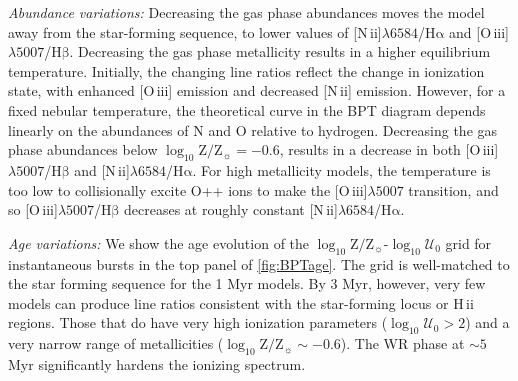 \documentclass[linenumbers, trackchanges, tighten]{aastex61}%
\newcommand{\Fig}[1]{\autoref{fig:#1}}
\newcommand{\logten}{\ensuremath{\log_{10}}}
\newcommand{\nii}{[N\,{\sc ii}]\xspace}
\newcommand{\oiii}{[O\,{\sc iii}]\xspace}
\newcommand{\ha}{\ensuremath{\mathrm{H\alpha}}}
\newcommand{\hb}{\ensuremath{\mathrm{H\beta}}}
\newcommand{\hii}{H\,{\sc ii}\xspace}
\newcommand\lam[1]{\ensuremath{\lambda #1}}
\newcommand{\logz}{\ensuremath{\logten \mathrm{Z}/\mathrm{Z}_{\sun}}}
\newcommand{\logZeq}[1]{\ensuremath{\logten \mathrm{Z}/\mathrm{Z}_{\sun} = #1}}
\newcommand{\logU}{\ensuremath{\logten \mathcal{U}_0}}
\newcommand\niiha{\nii{}\lam{6584}/\ha{}}
\newcommand\oiiihb{\oiii{}\lam{5007}/\hb{}}
\begin{document}
{\it Abundance variations:} Decreasing the gas phase abundances moves the model away from the star-forming sequence, to lower values of \niiha{} and \oiiihb{}. Decreasing the gas phase metallicity results in a higher equilibrium temperature. Initially, the changing line ratios reflect the change in ionization state, with enhanced \oiii{} emission and decreased \nii{} emission. However, for a fixed nebular temperature, the theoretical curve in the BPT diagram depends linearly on the abundances of N and O relative to hydrogen. Decreasing the gas phase abundances below \logZeq{-0.6},  results in a decrease in both \oiiihb{} and \niiha{}. For high metallicity models, the temperature is too low to collisionally excite O++ ions to make the \oiii{}\lam{5007} transition, and so \oiiihb{} decreases at roughly constant \niiha{}.

{\it Age variations:} We show the age evolution of the \logz{}-\logU{} grid for instantaneous bursts in the top panel of \Fig{BPTage}. The grid is well-matched to the star forming sequence for the 1 Myr models. By 3 Myr, however, very few models can produce line ratios consistent with the star-forming locus or \hii regions. Those that do have very high ionization parameters ($\logU > 2$) and a very narrow range of metallicities ($\logz \sim -0.6$). The WR phase at $\sim5$ Myr significantly hardens the ionizing spectrum.
\end{document}
